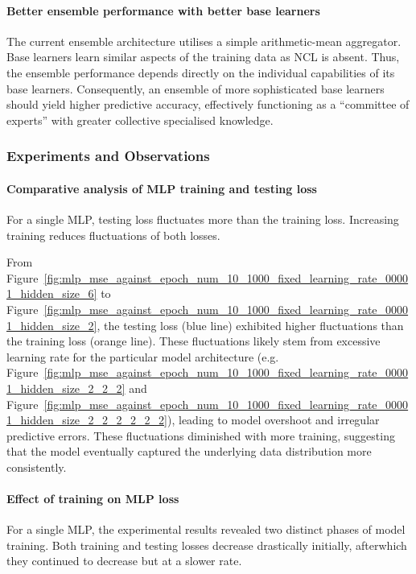 \paragraph{Better ensemble performance with better base learners}
The current ensemble architecture utilises a simple arithmetic-mean aggregator. Base learners learn similar aspects of the training data as NCL is absent. Thus, the ensemble performance depends directly on the individual capabilities of its base learners. Consequently, an ensemble of more sophisticated base learners should yield higher predictive accuracy, effectively functioning as a ``committee of experts'' with greater collective specialised knowledge. 


\subsubsection{Experiments and Observations}
\label{subsubsec:evaluation_baseline_observations}
\paragraph{Comparative analysis of MLP training and testing loss}
For a single MLP, testing loss fluctuates more than the training loss. Increasing training reduces fluctuations of both losses. 

From Figure~\ref{fig:mlp_mse_against_epoch_num_10_1000_fixed_learning_rate_00001_hidden_size_6} to Figure~\ref{fig:mlp_mse_against_epoch_num_10_1000_fixed_learning_rate_00001_hidden_size_2}, the testing loss (blue line) exhibited higher fluctuations than the training loss (orange line). These fluctuations likely stem from excessive learning rate for the particular model architecture (e.g. Figure~\ref{fig:mlp_mse_against_epoch_num_10_1000_fixed_learning_rate_00001_hidden_size_2_2_2} and Figure~\ref{fig:mlp_mse_against_epoch_num_10_1000_fixed_learning_rate_00001_hidden_size_2_2_2_2_2_2}), leading to model overshoot and irregular predictive errors. These fluctuations diminished with more training, suggesting that the model eventually captured the underlying data distribution more consistently. 

\paragraph{Effect of training on MLP loss}
For a single MLP, the experimental results revealed two distinct phases of model training. Both training and testing losses decrease drastically initially, afterwhich they continued to decrease but at a slower rate. 

